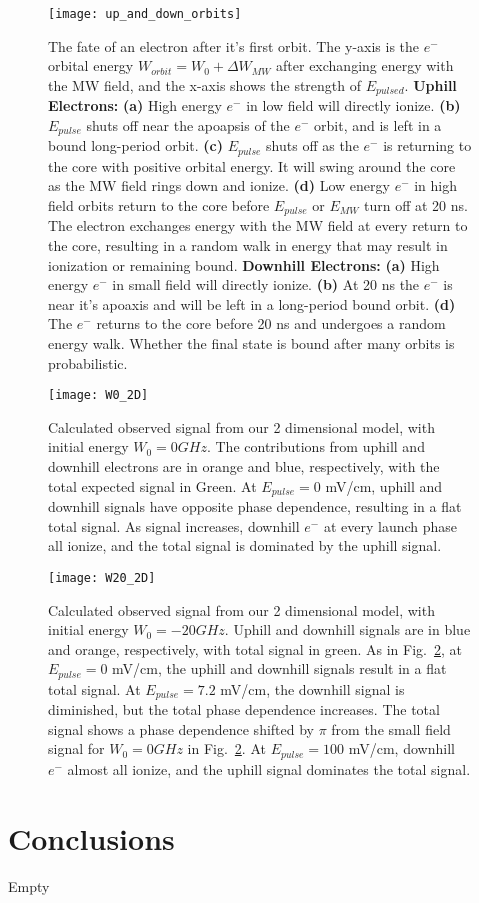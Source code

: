 \documentclass[aps,pra,preprint,groupedaddress]{revtex4-1}
\begin{document}
\begin{figure}
	\texttt{[image: up\_and\_down\_orbits]}
	\caption{The fate of an electron after it's first orbit. The y-axis is the $e^-$ orbital energy $W_{orbit} = W_0 + \Delta W_{MW}$ after exchanging energy with the MW field, and the x-axis shows the strength of $E_{pulsed}$. \textbf{Uphill Electrons:} \textbf{(a)} High energy $e^-$ in low field will directly ionize. \textbf{(b)} $E_{pulse}$ shuts off near the apoapsis of the $e^-$ orbit, and is left in a bound long-period orbit. \textbf{(c)} $E_{pulse}$ shuts off as the $e^-$ is returning to the core with positive orbital energy. It will swing around the core as the MW field rings down and ionize. \textbf{(d)} Low energy $e^-$ in high field orbits return to the core before $E_{pulse}$ or $E_{MW}$ turn off at 20 ns. The electron exchanges energy with the MW field at every return to the core, resulting in a random walk in energy that may result in ionization or remaining bound. \textbf{Downhill Electrons:} \textbf{(a)} High energy $e^-$ in small field will directly ionize. \textbf{(b)} At 20 ns the $e^-$ is near it's apoaxis and will be left in a long-period bound orbit. \textbf{(d)} The $e^-$ returns to the core before 20 ns and undergoes a random energy walk. Whether the final state is bound after many orbits is probabilistic.}
	\label{fig:orbits}	
\end{figure}

\begin{figure}
	\texttt{[image: W0\_2D]}
	\caption{Calculated observed signal from our 2 dimensional model, with initial energy $W_0 = 0 GHz$. The contributions from uphill and downhill electrons are in orange and blue, respectively, with the total expected signal in Green. At $E_{pulse} = 0$ mV/cm, uphill and downhill signals have opposite phase dependence, resulting in a flat total signal. As signal increases, downhill $e^-$ at every launch phase all ionize, and the total signal is dominated by the uphill signal.}
	\label{fig:2DW0}
\end{figure}

\begin{figure}
	\texttt{[image: W20\_2D]}
	\caption{Calculated observed signal from our 2 dimensional model, with initial energy $W_0 = -20 GHz$. Uphill and downhill signals are in blue and orange, respectively, with total signal in green. As in Fig.~\ref{fig:2DW0}, at $E_{pulse} = 0$ mV/cm, the uphill and downhill signals result in a flat total signal. At $E_{pulse} = 7.2$ mV/cm, the downhill signal is diminished, but the total phase dependence increases. The total signal shows a phase dependence shifted by $\pi$ from the small field signal for $W_0 = 0 GHz$ in Fig.~\ref{fig:2DW0}. At $E_{pulse} = 100$ mV/cm, downhill $e^-$ almost all ionize, and the uphill signal dominates the total signal.}
	\label{fig:2DW20}
\end{figure}

\section{\label{sec:conc} Conclusions}

Empty
\end{document}
